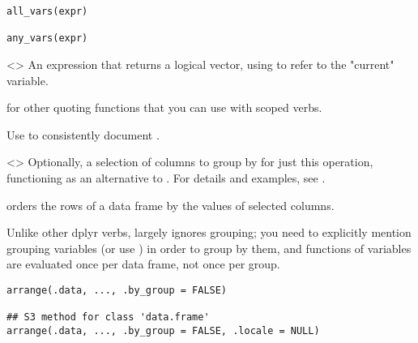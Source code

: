 \documentclass[a4paper]{book}
\begin{document}
%
\begin{Usage}
\begin{verbatim}
all_vars(expr)

any_vars(expr)
\end{verbatim}
\end{Usage}
%
\begin{Arguments}
\begin{ldescription}
\item[\code{expr}] <> An expression that
returns a logical vector, using  to refer to the "current" variable.
\end{ldescription}
\end{Arguments}
%
\begin{SeeAlso}
 for other quoting functions that you
can use with scoped verbs.
\end{SeeAlso}
%
\begin{Description}
Use  to consistently document .
\end{Description}
%
\begin{Arguments}
\begin{ldescription}
\item[\code{.by}] \strong{[Experimental]}

<> Optionally, a selection of columns to
group by for just this operation, functioning as an alternative to . For
details and examples, see .
\end{ldescription}
\end{Arguments}
%
\begin{Description}
 orders the rows of a data frame by the values of selected
columns.

Unlike other dplyr verbs,  largely ignores grouping; you
need to explicitly mention grouping variables (or use  )
in order to group by them, and functions of variables are evaluated
once per data frame, not once per group.
\end{Description}
%
\begin{Usage}
\begin{verbatim}
arrange(.data, ..., .by_group = FALSE)

## S3 method for class 'data.frame'
arrange(.data, ..., .by_group = FALSE, .locale = NULL)
\end{verbatim}
\end{Usage}
\end{document}
